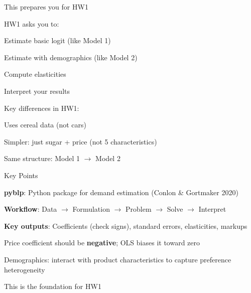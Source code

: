 \documentclass[notes,11pt, aspectratio=169]{beamer}
\newenvironment{wideitemize}{\itemize\addtolength{\itemsep}{10pt}}{\enditemize}
\newenvironment{wideenumerate}{\enumerate\addtolength{\itemsep}{10pt}}{\endenumerate}
\begin{document}
\begin{frame}{This prepares you for HW1}
	\begin{wideitemize}
		\item HW1 asks you to:
		\begin{wideenumerate}
			\vspace{5pt}
			\item Estimate basic logit (like Model 1)
			\item Estimate with demographics (like Model 2)
			\item Compute elasticities
			\item Interpret your results
		\end{wideenumerate}
		\item Key differences in HW1:
		\begin{wideitemize}
			\vspace{5pt}
			\item Uses cereal data (not cars)
			\item Simpler: just sugar + price (not 5 characteristics)
			\item Same structure: Model 1 $\rightarrow$ Model 2
		\end{wideitemize}
	\end{wideitemize}
\end{frame}


\begin{frame}{Key Points}
	\vspace{11pt}
	\begin{wideenumerate}
		\item \textbf{pyblp}: Python package for demand estimation (Conlon \& Gortmaker 2020)
		\item \textbf{Workflow}: Data $\rightarrow$ Formulation $\rightarrow$ Problem $\rightarrow$ Solve $\rightarrow$ Interpret
		\item \textbf{Key outputs}: Coefficients (check signs), standard errors, elasticities, markups
		\item Price coefficient should be \textbf{negative}; OLS biases it toward zero
		\item Demographics: interact with product characteristics to capture preference heterogeneity
		\item This is the foundation for HW1
	\end{wideenumerate}
\end{frame}
\end{document}
